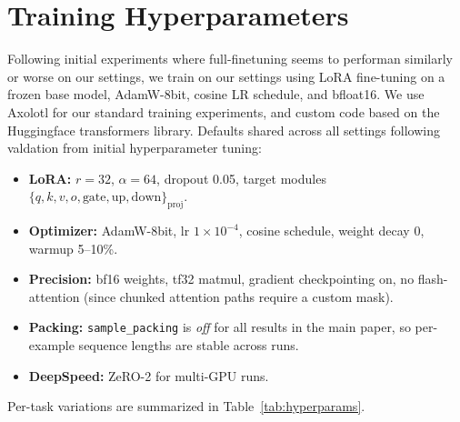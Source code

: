 \section{Training Hyperparameters}
\label{app:hyperparams}

Following initial experiments where full-finetuning seems to performan similarly or worse on our settings, we train on our settings using LoRA \citep{Hu2021LoRALA} fine-tuning on a frozen base model, AdamW-8bit, cosine LR schedule, and bfloat16. We use Axolotl \citep{axolotl} for our standard training experiments, and custom code based on the Huggingface \cite{wolf-etal-2020-transformers} transformers library.  Defaults shared across all settings following valdation from initial hyperparameter tuning:


\begin{itemize}
\item \textbf{LoRA:} $r{=}32$, $\alpha{=}64$, dropout 0.05, target modules $\{q,k,v,o,\text{gate},\text{up},\text{down}\}_\text{proj}$.
\item \textbf{Optimizer:} AdamW-8bit, lr $1\!\times\!10^{-4}$, cosine schedule, weight decay 0, warmup 5--10\%.
\item \textbf{Precision:} bf16 weights, tf32 matmul, gradient checkpointing on, no flash-attention (since chunked attention paths require a custom mask).
\item \textbf{Packing:} \texttt{sample\_packing} is \emph{off} for all results in the main paper, so per-example sequence lengths are stable across runs.
\item \textbf{DeepSpeed:} ZeRO-2 for multi-GPU runs.
\end{itemize}

Per-task variations are summarized in Table~\ref{tab:hyperparams}. 

